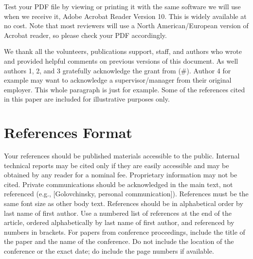 \documentclass[sigchi-a, authorversion]{acmart}
\begin{document}
Test your PDF file by viewing or printing it with the same software we
will use when we receive it, Adobe Acrobat Reader Version 10. This is
widely available at no cost. Note that most reviewers will use a North
American/European version of Acrobat reader, so please check your PDF
accordingly.

\begin{acks}
  We thank all the volunteers, publications support, staff, and
  authors who wrote and provided helpful comments on previous versions
  of this document. As well authors 1, 2, and 3 gratefully acknowledge
  the grant from 
  (\#). Author 4 for example may want to
  acknowledge a supervisor/manager from their original employer. This
  whole paragraph is just for example. Some of the references cited in
  this paper are included for illustrative purposes only.
\end{acks}

\section{References Format}

Your references should be published materials accessible to the
public. Internal technical reports may be cited only if they are
easily accessible and may be obtained by any reader for a nominal fee.
Proprietary information may not be cited. Private communications
should be acknowledged in the main text, not referenced (e.g.,
[Golovchinsky, personal communication]). References must be the same
font size as other body text. References should be in alphabetical
order by last name of first author. Use a numbered list of references
at the end of the article, ordered alphabetically by last name of
first author, and referenced by numbers in brackets. For papers from
conference proceedings, include the title of the paper and the name of
the conference. Do not include the location of the conference or the
exact date; do include the page numbers if available.
\end{document}
